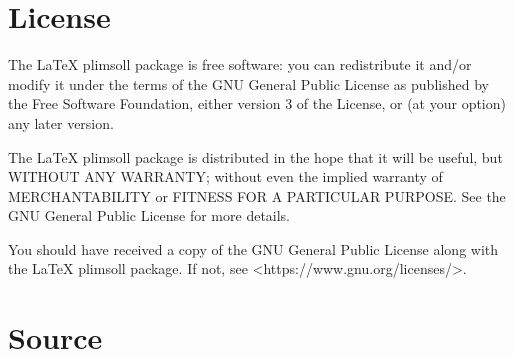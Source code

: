 \documentclass[11pt,english,fleqn,parskip=half]{scrartcl}
\begin{document}
\section{License}
\label{sec:license}


The LaTeX plimsoll package is free software: you can redistribute it
and/or modify it under the terms of the GNU General Public License
as published by the Free Software Foundation, either version 3 of
the License, or (at your option) any later version.

The LaTeX plimsoll package is distributed in the hope that it will
be useful, but WITHOUT ANY WARRANTY; without even the implied
warranty of MERCHANTABILITY or FITNESS FOR A PARTICULAR PURPOSE. See
the GNU General Public License for more details.

You should have received a copy of the GNU General Public License
along with the LaTeX plimsoll package. If not, see
<https://www.gnu.org/licenses/>.

\clearpage
\section{Source}
\label{sec:source}


\end{document}
